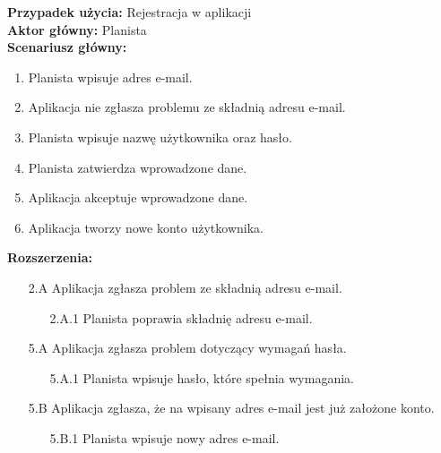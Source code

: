 \noindent
\textbf{Przypadek użycia:} Rejestracja w aplikacji\\
\textbf{Aktor główny:} Planista\\
\textbf{Scenariusz główny:}
\begin{enumerate}
	\item Planista wpisuje adres e-mail.
	\item Aplikacja nie zgłasza problemu ze składnią adresu e-mail.
	\item Planista wpisuje nazwę użytkownika oraz hasło.
	\item Planista zatwierdza wprowadzone dane.
	\item Aplikacja akceptuje wprowadzone dane.
	\item Aplikacja tworzy nowe konto użytkownika.
\end{enumerate}
\pagebreak
\textbf{Rozszerzenia:}
	\begin{enumerate}
         \item[2.A] Aplikacja zgłasza problem ze składnią adresu e-mail.
         \begin{enumerate}
         	\item[2.A.1] Planista poprawia składnię adresu e-mail.
         \end{enumerate}
         \item[5.A] Aplikacja zgłasza problem  dotyczący wymagań hasła.
         \begin{enumerate}
         	\item[5.A.1] Planista wpisuje hasło, które spełnia wymagania.
         \end{enumerate}
         \item[5.B] Aplikacja zgłasza, że na wpisany adres e-mail jest już założone konto.
         \begin{enumerate}
         	\item[5.B.1] Planista wpisuje nowy adres e-mail.
         \end{enumerate}
	\end{enumerate}
	
